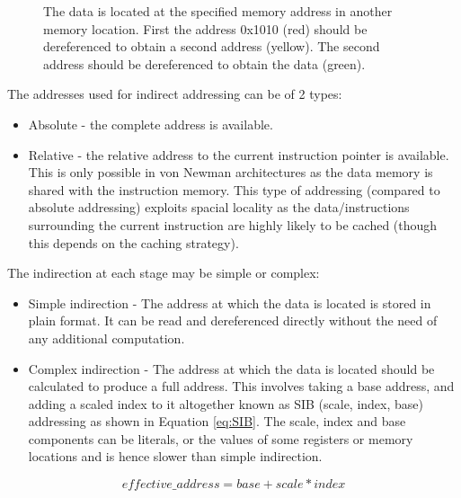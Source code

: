 \documentclass{report}
\begin{document}
\begin {figure}[H]
\caption {The data is located at the specified memory address in another memory
location. First the address 0x1010 (red) should be dereferenced to obtain a
second address (yellow). The second address should be dereferenced to obtain
the data (green).}
\label {fig:multi-level-indirection}
\end {figure}

The addresses used for indirect addressing can be of 2 types:

\begin{itemize}
    \item{Absolute - the complete address is available. }
    \item{Relative - the relative address to the current instruction pointer is
        available. This is only possible in von Newman architectures as the data
        memory is shared with the instruction memory. This type of addressing
        (compared to absolute addressing) exploits spacial locality as the
        data/instructions surrounding the current instruction are highly likely
        to be cached (though this depends on the caching strategy). }
\end{itemize}

The indirection at each stage may be simple or complex:

\begin{itemize}
    \item{Simple indirection - The address at which the data is located is
        stored in plain format. It can be read and dereferenced directly without
        the need of any additional computation. }
    \item{Complex indirection - The address at which the data is located should
        be calculated to produce a full address. This involves taking a base
        address, and adding a scaled index to it altogether known as SIB (scale,
        index, base) addressing as shown in Equation \ref{eq:SIB}. The scale,
        index and base components can be literals, or the values of some
        registers or memory locations and is hence slower than simple
        indirection.}
\end{itemize}

\begin{equation}
    \label{eq:SIB}
    effective\_address = base + scale * index
\end{equation}
\end{document}
